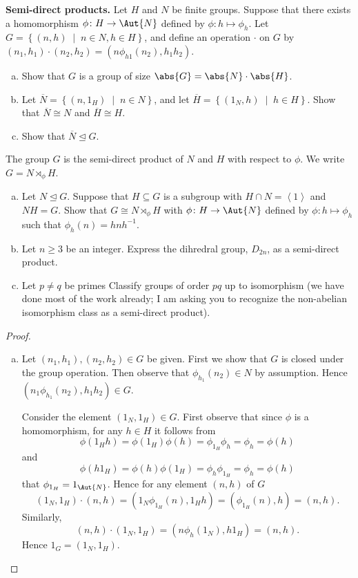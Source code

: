 \documentclass[10pt]{amsart}
\begin{document}
\begin{thm}
  {\bf Semi-direct products.}
  Let $H$ and $N$ be finite groups.
  Suppose that there exists a homomorphism $\phi \colon H \rightarrow \Aut{N}$ defined by $\phi \colon h \mapsto \phi_h$.
  Let $G = \left\{ (n,h) \;\middle\vert\; n \in N, h \in H \right\}$, and define an operation $\cdot$ on $G$ by $(n_1,h_1)\cdot(n_2,h_2) = (n\phi_{h1}(n_2), h_1h_2)$.
  \begin{enumerate}[(a)]
  \item
    Show that $G$ is a group of size $\abs{G} = \abs{N}\cdot\abs{H}$.
  \item
    Let $\overline{N} = \left\{(n, 1_H) \;\middle\vert\; n \in N \right\}$, and let $\overline{H} = \left\{(1_N, h) \;\middle\vert\; h \in H \right\}$.
    Show that $\overline{N} \cong N$ and $\overline{H} \cong H$.
  \item
    Show that $\overline{N} \unlhd G$.
    \setcounter{saveenum}{\value{enumi}}
  \end{enumerate}
  The group $G$ is the semi-direct product of $N$ and $H$ with respect to $\phi$.
  We write $G = N \rtimes_\phi H$.
  \begin{enumerate}[(a)]
    \setcounter{enumi}{\value{saveenum}}
  \item
    Let $N \unlhd G$.
    Suppose that $H \subseteq G$ is a subgroup with $H \cap N = \left< 1 \right>$ and $NH = G$.
    Show that $G \cong N \rtimes_\phi H$ with $\phi \colon H \rightarrow \Aut{N}$ defined by $\phi \colon h \mapsto \phi_h$ such that $\phi_h(n) = hnh^{-1}$.
  \item
    Let $n \geq 3$ be an integer.
    Express the dihredral group, $D_{2n}$, as a semi-direct product.
  \item
    Let $p \not = q$ be primes
    Classify groups of order $pq$ up to isomorphism (we have done most of the work already; I am asking you to recognize the non-abelian isomorphism class as a semi-direct product).
  \end{enumerate}
  \begin{proof}
    \begin{enumerate}[(a)]
    \item
      Let $(n_1, h_1), (n_2, h_2) \in G$ be given.
      First we show that $G$ is closed under the group operation.
      Then observe that $\phi_{h_1}(n_2) \in N$ by assumption.
      Hence $(n_1\phi_{h_1}(n_2), h_1h_2) \in G$.
      
      Consider the element $(1_N, 1_H) \in G$.
      First observe that since $\phi$ is a homomorphism, for any $h \in H$ it follows from 
      $$\phi(1_Hh) = \phi(1_H)\phi(h) = \phi_{1_H}\phi_h = \phi_h = \phi(h)$$
      and
      $$\phi(h1_H) = \phi(h)\phi(1_H) = \phi_h\phi_{1_H} = \phi_h = \phi(h)$$
      that $\phi_{1_H} = 1_{\Aut{N}}$.
      Hence for any element $(n,h)$ of $G$
      $$(1_N,1_H) \cdot (n,h) = (1_N \phi_{1_H}(n), 1_Hh) = (\phi_{1_H}(n), h) = (n, h).$$
      Similarly, 
      $$(n,h) \cdot (1_N,1_H) = (n \phi_{h}(1_N), h1_H) = (n, h).$$
      Hence $1_G = (1_N, 1_H)$.
      

\end{enumerate}
\end{proof}
\end{thm}
\end{document}

